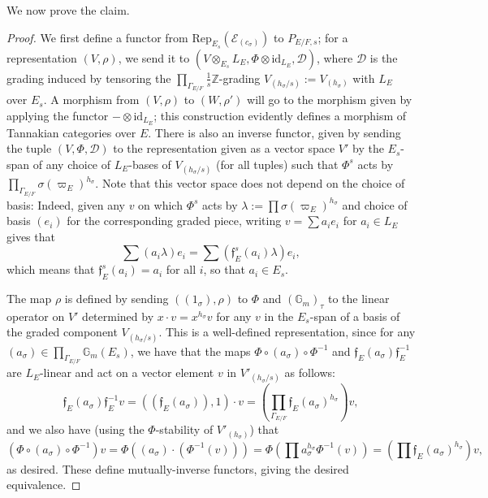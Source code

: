 \documentclass[11pt]{amsart}
\theoremstyle{definition}
\newcommand{\mc}{\mathcal}
\newcommand{\Z}{\mathbb{Z}}
\newcommand{\mf}{\mathfrak}
\begin{document}
We now prove the claim.
\begin{proof}
We first define a functor from $\text{Rep}_{E_{s}}(\mc{E}_{(c_{\sigma})})$ to $P_{E/F,s}$; for a representation $(V, \rho)$, we send it to $(V \otimes_{E_{s}} L_{E}, \Phi \otimes \text{id}_{L_{E}}, \mc{D})$, where $\mc{D}$ is the grading induced by tensoring the $\prod_{\Gamma_{E/F}} \frac{1}{s} \Z$-grading $V_{(h_{\sigma}/s)} := V_{(h_{\sigma})}$ with $L_{E}$ over $E_{s}$. A morphism from $(V, \rho)$ to $(W, \rho')$ will go to the morphism given by applying the functor $- \otimes \text{id}_{L_{E}}$; this construction evidently defines a morphism of Tannakian categories over $E$. There is also an inverse functor, given by sending the tuple $(V, \Phi, \mc{D})$ to the representation given as a vector space $V'$ by the $E_{s}$-span of any choice of $L_{E}$-bases of $V_{(h_{\sigma}/s)}$ (for all tuples) such that $\Phi^{s}$ acts by $\prod_{\Gamma_{E/F}} \sigma(\varpi_{E})^{h_{\sigma}}$. Note that this vector space does not depend on the choice of basis: Indeed, given any $v$ on which $\Phi^{s}$ acts by $\lambda := \prod \sigma(\varpi_{E})^{h_{\sigma}}$ and choice of basis $(e_{i})$ for the corresponding graded piece, writing $v = \sum a_{i}e_{i}$ for $a_{i} \in L_{E}$ gives that $$\sum (a_{i} \lambda)e_{i} = \sum (\mf{f}_{E}^{s}(a_{i})\lambda) e_{i},$$ which means that $\mf{f}_{E}^{s}(a_{i}) = a_{i}$ for all $i$, so that $a_{i} \in E_{s}$. 

The map $\rho$ is defined by sending $((1_{\sigma}), \rho)$ to $\Phi$ and $(\mathbb{G}_{m})_{\tau}$ to the linear operator on $V'$ determined by $x \cdot v = x^{h_{\sigma}}v$ for any $v$ in the $E_{s}$-span of a basis of the graded component $V_{(h_{\sigma}/s)}$. This is a well-defined representation, since for any $(a_{\sigma})\in \prod_{\Gamma_{E/F}} \mathbb{G}_{m}(E_{s})$, we have that the maps $\Phi \circ (a_{\sigma}) \circ \Phi^{-1}$ and $\mf{f}_{E} (a_{\sigma}) \mf{f}_{E}^{-1}$ are $L_{E}$-linear and act on a vector element $v$ in $V'_{(h_{\sigma}/s)}$ as follows: $$\mf{f}_{E} (a_{\sigma}) \mf{f}_{E}^{-1}v = ((\mf{f}_{E}(a_{\sigma})),1) \cdot v = (\prod_{\Gamma_{E/F}} \mf{f}_{E}(a_{\sigma})^{h_{\sigma}})v,$$ and we also have (using the $\Phi$-stability of $V'_{(h_{\sigma})}$) that $$(\Phi \circ (a_{\sigma}) \circ \Phi^{-1})v = \Phi( (a_{\sigma}) \cdot (\Phi^{-1}(v))) = \Phi(\prod a_{\sigma}^{h_{\sigma}}\Phi^{-1}(v)) = (\prod \mf{f}_{E}(a_{\sigma})^{h_{\sigma}})v,$$ as desired. These define mutually-inverse functors, giving the desired equivalence.
\end{proof}
\end{document}
